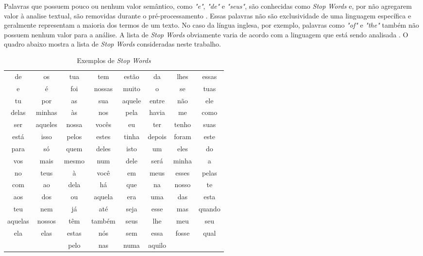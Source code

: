 Palavras que possuem pouco ou nenhum valor semântico, como \textit{"e"}, \textit{"de"} e \textit{"seus"}, são conhecidas como \textit{Stop Words} e, por não agregarem valor à analise textual, são removidas durante o pré-processamento \cite{rajaraman2011}. Essas palavras não são exclusividade de uma linguagem específica e geralmente representam a maioria dos termos de um texto. No caso da língua inglesa, por exemplo, palavras como \textit{"of"} e \textit{"the"} também não possuem nenhum valor para a análise. A lista de \textit{Stop Words} obviamente varia de acordo com a linguagem que está sendo analisada \cite{lopes2015}. O quadro abaixo mostra a lista de \textit{Stop Words} consideradas neste trabalho.

\begin{table}[h]
\centering
\begin{tabular}{cccccccc}
\cline{1-8}
de & os & tua & tem & estão & da & lhes & essas \\
e & é & foi & nossas & muito & o & se & tuas \\
tu & por & as & sua & aquele & entre & não & ele \\
delas & minhas & às & nos & pela & havia & me & como \\
ser & aqueles & nossa & vocês & eu & ter & tenho & suas \\
está & isso & pelos & estes & tinha & depois & foram & este \\
para & só & quem & deles & isto & um & eles & do \\
vos & mais & mesmo & num & dele & será & minha & a \\
no & teus & à & você & em & meus & esses & pelas \\
com & ao & dela & há & que & na & nosso & te \\
aos & dos & ou & aquela & era & uma & das & esta \\
teu & nem & já & até & seja & esse & mas & quando \\
aquelas & nossos & têm & também & seus & lhe & meu & seu \\
ela & elas & estas & nós & sem & essa & fosse & qual \\
& & pelo & nas & numa & aquilo & & \\
\cline{1-8}
\end{tabular}
\caption{Exemplos de \textit{Stop Words}}
\label{exemplos-stop-words}
\end{table}

